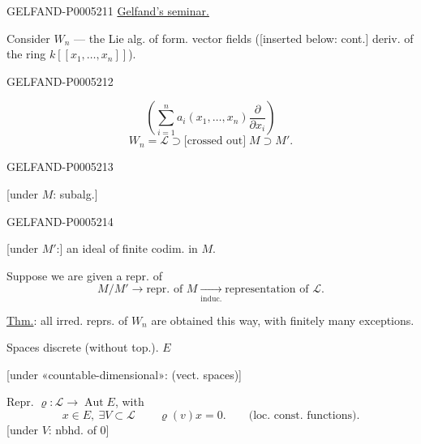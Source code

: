 \begin{GelfandAdjacentEvidence}{GELFAND-P000521}{1}
\qquad \uline{Gelfand’s seminar.}

\qquad
{}

Consider $W_n$ — the Lie alg. of form. vector fields
([inserted below: cont.] deriv. of the ring $k[[x_1,\ldots,x_n]]$).
\end{GelfandAdjacentEvidence}
\begin{GelfandAdjacentEvidence}{GELFAND-P000521}{2}

\[
\left(\sum_{i=1}^{n}a_i(x_1,\ldots,x_n)\frac{\partial}{\partial x_i}\right)
\]
\[
W_n=\mathcal L\supset \text{[crossed out]}\;M\supset M'.
\]
\end{GelfandAdjacentEvidence}
\begin{GelfandAdjacentEvidence}{GELFAND-P000521}{3}

[under $M$: subalg.]
\end{GelfandAdjacentEvidence}
\begin{GelfandAdjacentEvidence}{GELFAND-P000521}{4}

[under $M'$:] an ideal of finite codim. in $M$.

Suppose we are given a repr. of 
\[
M/M'\longrightarrow\text{repr. of }M
\underset{\text{induc.}}{\longrightarrow}\text{representation of }\mathcal L.
\]

\uline{Thm.}: all irred. reprs. of $W_n$ are obtained this way, with finitely many exceptions.

Spaces  discrete (without top.). $E$

[under «countable-dimensional»: (vect. spaces)]

Repr. $\varrho:\mathcal L\longrightarrow\operatorname{Aut}E$, with
\[
x\in E,\ \exists V\subset\mathcal L\qquad \varrho(v)x=0.
\qquad\text{(loc. const. functions).}
\]
[under $V$: nbhd. of $0$]
\end{GelfandAdjacentEvidence}
